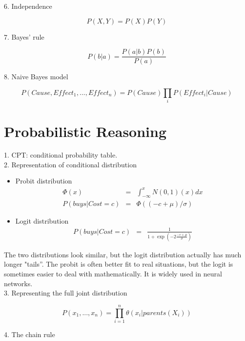 \documentclass[12pt]{article}
\begin{document}
6. Independence

\begin{equation*}
P(X,Y) = P(X)P(Y)
\end{equation*}

7. Bayes' rule

\begin{equation*}
P(b|a) = \frac {P(a|b)P(b)}{P(a)}
\end{equation*}

8. Naive Bayes model

\begin{equation*}
P(Cause, Effect_1,..., Effect_n) =
P(Cause) \prod_iP(Effect_i|Cause)
\end{equation*}

\section*{Probabilistic Reasoning}

1. CPT: conditional probability table. \\

2. Representation of conditional distribution

\begin{itemize}
  \item Probit distribution
    \begin{eqnarray*}
      \Phi(x) &=& \int^x_{-\infty} N(0,1)(x)dx \\
      P(buys | Cost = c) &=& \Phi((-c + \mu) / \sigma)
    \end{eqnarray*}
  \item Logit distribution
    \begin{eqnarray*}
      P(buys | Cost = c) &=&
      \frac {1}{1 + \exp(-2 \frac {-c + \mu}{\sigma})}
    \end{eqnarray*}
\end{itemize}

The two distributions look similar, but the logit distribution actually has much longer "tails''. The probit is often better fit to real situations, but the logit is sometimes easier to deal with mathematically. It is widely used in neural networks. \\

3. Representing the full joint distribution

\begin{equation*}
P(x_1,...,x_n) = \prod^n_{i=1} \theta(x_i | parents(X_i))
\end{equation*}

4. The chain rule
\end{document}
